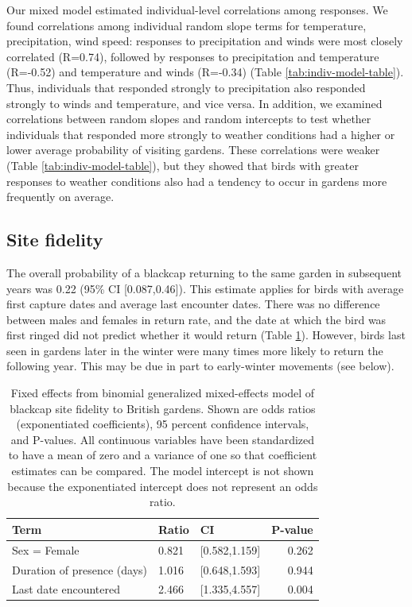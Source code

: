 \documentclass[a4paper, twoside]{templates/ociamthesis}
\begin{document}
Our mixed model estimated individual-level correlations among responses. We found correlations among individual random slope terms for temperature, precipitation, wind speed: responses to precipitation and winds were most closely correlated (R=0.74), followed by responses to precipitation and temperature (R=-0.52) and temperature and winds (R=-0.34) (Table \ref{tab:indiv-model-table}). Thus, individuals that responded strongly to precipitation also responded strongly to winds and temperature, and vice versa. In addition, we examined correlations between random slopes and random intercepts to test whether individuals that responded more strongly to weather conditions had a higher or lower average probability of visiting gardens. These correlations were weaker (Table \ref{tab:indiv-model-table}), but they showed that birds with greater responses to weather conditions also had a tendency to occur in gardens more frequently on average.

\hypertarget{site-fidelity-1}{%
\subsection{Site fidelity}\label{site-fidelity-1}}

The overall probability of a blackcap returning to the same garden in subsequent years was 0.22 (95\% CI {[}0.087,0.46{]}). This estimate applies for birds with average first capture dates and average last encounter dates. There was no difference between males and females in return rate, and the date at which the bird was first ringed did not predict whether it would return (Table \ref{tab:fidelity-model-table}). However, birds last seen in gardens later in the winter were many times more likely to return the following year. This may be due in part to early-winter movements (see below).

\begin{table}[t]

\caption{\label{tab:fidelity-model-table}Fixed effects from binomial generalized mixed-effects model of blackcap site fidelity to British gardens. Shown are odds ratios (exponentiated coefficients), 95 percent confidence intervals, and P-values. All continuous variables have been standardized to have a mean of zero and a variance of one so that coefficient estimates can be compared. The model intercept is not shown because the exponentiated intercept does not represent an odds ratio.}
\centering
\begin{tabular}{l|l|l|r}
\hline
Term & Ratio & CI & P-value\\
\hline
Sex = Female & 0.821 & [0.582,1.159] & 0.262\\
\hline
Duration of presence (days) & 1.016 & [0.648,1.593] & 0.944\\
\hline
Last date encountered & 2.466 & [1.335,4.557] & 0.004\\
\hline
\end{tabular}
\end{table}
\end{document}
